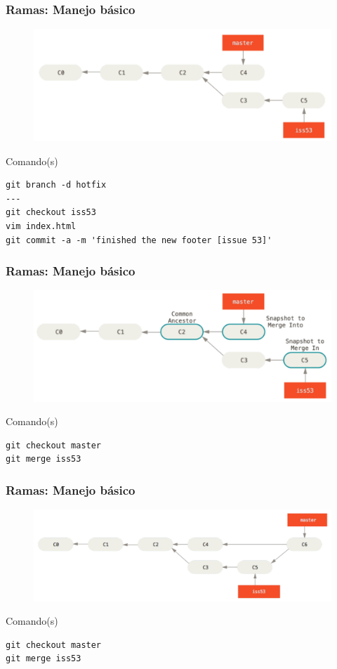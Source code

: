 \documentclass{beamer}
\begin{document}
\begin{frame}[fragile]
\frametitle{Ramas: Manejo básico}
\begin{figure}
\includegraphics[width=0.85\linewidth]{img/branching-6.png}
\end{figure}
\vskip 0.30cm
\footnotesize
\begin{block}{Comando(s)}
\begin{verbatim}
git branch -d hotfix
---
git checkout iss53
vim index.html
git commit -a -m 'finished the new footer [issue 53]'
\end{verbatim}
\end{block}
\end{frame}

\begin{frame}[fragile]
\frametitle{Ramas: Manejo básico}
\begin{figure}
\includegraphics[width=0.85\linewidth]{img/branching-7.png}
\end{figure}
\vskip 0.30cm
\footnotesize
\begin{block}{Comando(s)}
\begin{verbatim}
git checkout master
git merge iss53
\end{verbatim}
\end{block}
\end{frame}

\begin{frame}[fragile]
\frametitle{Ramas: Manejo básico}
\begin{figure}
\includegraphics[width=0.85\linewidth]{img/branching-8.png}
\end{figure}
\vskip 0.30cm
\footnotesize
\begin{block}{Comando(s)}
\begin{verbatim}
git checkout master
git merge iss53
\end{verbatim}
\end{block}
\end{frame}
\end{document}
